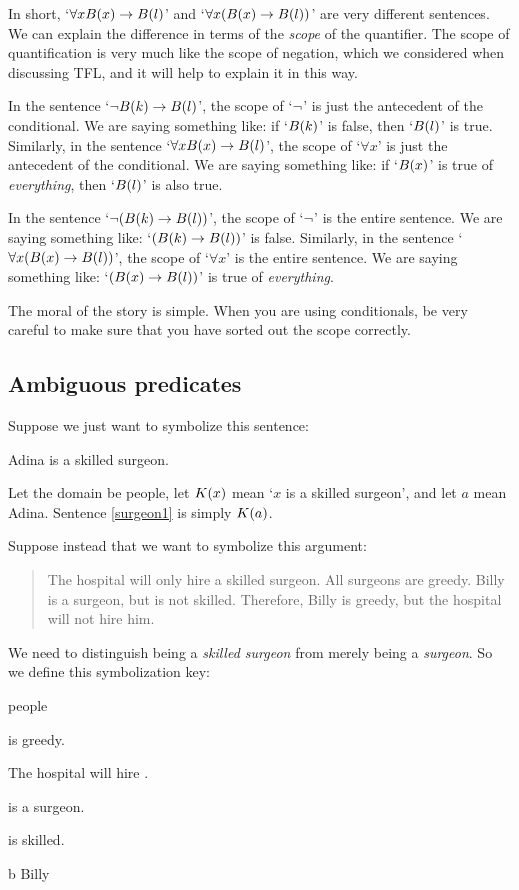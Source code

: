 In short, `$\forall x \mathord{B}(x) \rightarrow \mathord{B}(l)$' and `$\forall x (\mathord{B}(x) \rightarrow \mathord{B}(l))$' are very different sentences. We can explain the difference in terms of the \emph{scope} of the quantifier. The scope of quantification is very much like the scope of negation, which we considered when discussing TFL, and it will help to explain it in this way.

In the sentence `$\neg \mathord{B}(k) \rightarrow \mathord{B}(l)$', the scope of `$\neg$' is just the antecedent of the conditional. We are saying something like: if `$\mathord{B}(k)$' is false, then `$\mathord{B}(l)$' is true. Similarly, in the sentence `$\forall x \mathord{B}(x) \rightarrow \mathord{B}(l)$', the scope of `$\forall x$' is just the antecedent of the conditional. We are saying something like: if `$\mathord{B}(x)$' is true of \emph{everything}, then `$\mathord{B}(l)$' is also true. 

In the sentence `$\neg(\mathord{B}(k) \rightarrow \mathord{B}(l))$', the scope of `$\neg$' is the entire sentence. We are saying something like: `$(\mathord{B}(k) \rightarrow \mathord{B}(l))$' is false. Similarly, in the sentence `$\forall x (\mathord{B}(x) \rightarrow \mathord{B}(l))$', the scope of `$\forall x$' is the entire sentence. We are saying something like: `$(\mathord{B}(x) \rightarrow \mathord{B}(l))$' is true of \emph{everything}.

The moral of the story is simple. When you are using conditionals, be very careful to make sure that you have sorted out the scope correctly. 

\subsection{Ambiguous predicates}

Suppose we just want to symbolize this sentence:
\begin{earg}
\item[\ex{surgeon1}] Adina is a skilled surgeon.
\end{earg}
Let the domain be people, let $\mathord{K}(x)$ mean `$x$ is a skilled surgeon', and let $a$ mean Adina. Sentence \ref{surgeon1} is simply $\mathord{K}(a)$.


Suppose instead that we want to symbolize this argument:
\begin{quote}
The hospital will only hire a skilled surgeon. All surgeons are greedy. Billy is a surgeon, but is not skilled. Therefore, Billy is greedy, but the hospital will not hire him.
\end{quote}
We need to distinguish being a \emph{skilled surgeon} from merely being a \emph{surgeon}. So we define this symbolization key:
\begin{ekey}
\item[\text{domain}] people
\item[\atom{G}{x}]  is greedy.
\item[\atom{H}{x}] The hospital will hire .
\item[\atom{R}{x}]  is a surgeon.
\item[\atom{K}{x}]  is skilled.
\item[b] Billy
\end{ekey}

